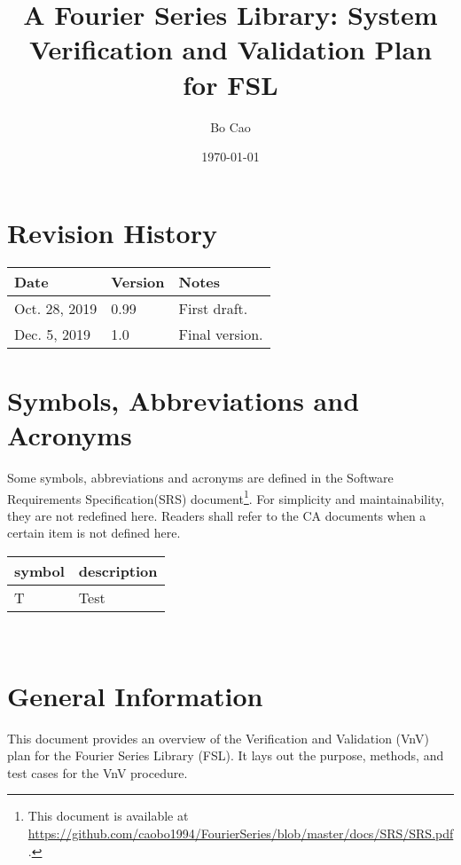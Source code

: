 \documentclass[12pt, titlepage]{article}
\begin{document}
\title{A Fourier Series Library: System Verification and Validation Plan for FSL} 
\author{Bo Cao}
\date{\today}
	
\maketitle


\section{Revision History}

\begin{tabularx}{\textwidth}{p{3cm}p{2cm}X}
\toprule {\bf Date} & {\bf Version} & {\bf Notes}\\
\midrule
Oct. 28, 2019  & 0.99 & First draft.\\
Dec. 5, 2019 & 1.0 & Final version.\\
\bottomrule
\end{tabularx}

\newpage

\tableofcontents

\newpage

\section{Symbols, Abbreviations and Acronyms}

Some symbols, abbreviations and acronyms are defined in the Software Requirements Specification(SRS)
document\footnote{This document is available at
\url{https://github.com/caobo1994/FourierSeries/blob/master/docs/SRS/SRS.pdf}.}. For
simplicity and maintainability, they are not redefined here. Readers shall refer
to the CA documents when a certain item is not defined here.

\vspace{1cm}

\renewcommand{\arraystretch}{1.2}
\begin{tabular}{l l} 
  \toprule		
  \textbf{symbol} & \textbf{description}\\
  \midrule 
  T & Test\\
  \bottomrule
\end{tabular}\\

\newpage



\section{General Information} This document provides an overview of the
Verification and Validation (VnV) plan for the Fourier Series Library (FSL). It
lays out the purpose, methods, and test cases for the VnV procedure.
\end{document}
